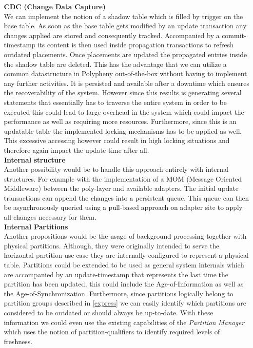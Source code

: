 \textbf{CDC (Change Data Capture)}\\
We can implement the notion of a shadow table which is filled by trigger on the base table.
As soon as the base table gets modified by an update transaction any changes applied are stored and consequently tracked.
Accompanied by a commit-timestamp its content is then used inside propagation transactions to refresh outdated placements.
Once placements are updated the propagated entries inside the shadow table are deleted. 
This has the advantage that we can utilize a common datastructure in Polypheny out-of-the-box without having to implement any further activities.
It is persisted and available after a downtime which ensures the recoverability of the system.
However since this results is generating several statements that essentially has to traverse the entire system in order to be executed this could lead to 
large overhead in the system which could impact the performance as well as requiring more resources.
Furthermore, since this is an updatable table the implemented locking mechanisms has to be applied as well. This excessive accessing however could result in high 
locking situations and therefore again impact the update time after all.\\

\textbf{Internal structure}\\
Another possibility would be to handle this approach entirely with internal structures.
For example with the implementation of a MOM (Message Oriented Middleware) between the poly-layer and available adapters. The initial update transactions can append 
the changes into a persistent queue. This queue can then be asynchronously queried using a pull-based approach on adapter site to apply all changes necessary for them. \\

\textbf{Internal Partitions} \\
Another propositions would be the usage of background processing together with physical partitions. Although, they were originally intended to serve the horizontal partition 
use case they are internally configured to represent a physical table. Partitions could be extended to be used as general system internals
which are accompanied by an update-timestamp that represents the last time the partition has been updated, this could include the Age-of-Information as well as 
the Age-of-Synchronization. Furthermore, since partitions logically belong to partition groups described in \ref{express} we can easily identify which partitions are considered to be 
outdated or should always be up-to-date. With these information we could even use the existing capabilities of the \emph{Partition Manager} which uses the notion of 
partition-qualifiers to identify required levels of freshness.

